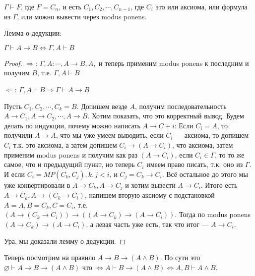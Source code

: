 \begin{definition}
	$\Gamma \vdash F$, где $F = C_n$, и есть $C_1, C_2, \cdots, C_{n-1}$,  где $C_i$ это или аксиома, или формула из $\Gamma$, или можно вывести через modus ponens.  
\end{definition}
\begin{lemma}
	Лемма о дедукции:

	$\Gamma \vdash A \to B \Leftrightarrow \Gamma, A \vdash B$
\end{lemma}
\begin{proof}
	
	$\Rightarrow$: $\Gamma, A : \cdots, A \to B, A, $ и теперь применим modus ponens к последним и получим $B$, т.е. $\Gamma, A \vdash B$

	$\Leftarrow$: $\Gamma, A \vdash B \Rightarrow \Gamma \vdash A \to B$

	Пусть $C_1, C_2, \cdots, C_k = B$. Допишем везде $A$, получим последовательность $A \to C_1, A \to C_2, \cdots, A \to B$. Хотим показать, что это корректный вывод. Будем делать по индукции, почему можно написать $A \to C+i$: Если $C_i = A$, то получили $A \to A$, что мы уже умеем выводить, если $C_i$ --- аксиома, то допишем $C_i$ т.к. это аксиома, а затем допишем $C_i \to (A \to C_i)$, что аксиома, затем применим modus ponens и получим как раз $(A \to C_i)$, если $C_i \in \Gamma$, то то же самое, что и предыдущий пункт, но теперь $C_i$ имеем право писать, т.к. оно из $\Gamma$. И если $C_i = MP(C_k, C_j), k, j < i$, и $C_j = C_k \to C_i$. Всё остальное до этого мы уже конвертировали в $A \to C_k, A \to C_j$ и хотим вывести $A \to C_i$. Итого есть $A \to C_k, A \to (C_k \to C_i)$, напишем вторую аксиому с подстановкой $A = A, B = C_k, C = C_i$, т.е. $(A \to (C_k \to C_i)) \to ((A \to C_k) \to (A \to C_i))$. Тогда по modus ponens $(A \to C_k) \to (A \to C_i)$, а левая часть уже есть, так что итог --- $A \to C_i$.

	Ура, мы доказали лемму о дедукции.
\end{proof}

Теперь посмотрим на правило $A \to B \to (A \land B)$. По сути это $\varnothing \vdash A \to B \to (A \land B)$ что $\Leftrightarrow A \vdash B \to (A \land B) \Leftrightarrow A, B \vdash A \land B$.

